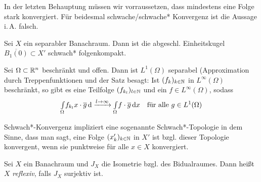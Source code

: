 \documentclass{cheat-sheet}
\newcommand{\IntO}[2]{\Int{\Omega}{}{#1}{#2}} %
\newcommand{\convWith}[1]{\xrightarrow{#1 \to \infty}} %
\newcommand{\convWeaklyWith}[1]{\xrightharpoonup{#1 \to \infty}} %
\begin{document}
\begin{acht}
  In der letzten Behauptung müssen wir vorraussetzen, dass mindestens eine Folge stark konvergiert. Für beidesmal schwache/schwache* Konvergenz ist die Aussage i.\,A. falsch.
\end{acht}

\iffalse
\begin{bsp}
  \begin{itemize}
    \item Sei $1 \leq p < \infty$ und $\tfrac{1}{p} + \tfrac{1}{p'} = 1$ und $\omega \subset \R^n$ beschränkt. Dann gilt für $f, f_k \in L^p(\Omega)$:
    \[ f_k \convWeaklyWith{k} f \text{ in } L^p(\Omega) \iff \fa{g \in L^p(\Omega)} \IntO{f_k \cdot \overline{g}}{x} \convWith{k} \IntO{f \cdot \overline{g}}{x} \]
    \item Sei $\Omega \subset \R^n$ boffen und beschränkt und $1 \leq p \leq \infty$, $m \in \N_{> 0}$. Für $u, u_k \in W^{m,p}(\Omega)$ gilt dann:
    \[ u_k \convWeaklyWith{k} u \text{ in } W^{m,p}(\Omega) \iff \fa{s, \abs{s} \leq m} \partial^s u_k \convWeaklyWith{k} \partial^s u \text{ in } L^p(\Omega) \]
  \end{itemize}
\end{bsp}
\fi

\begin{satz}
  Sei $X$ ein separabler Banachraum. Dann ist die abgeschl. Einheitskugel $\overline{B_1(0)} \subset X'$ schwach* folgenkompakt.
\end{satz}

\begin{bsp}
  Sei $\Omega \subset \R^n$ beschränkt und offen. Dann ist $L^1(\Omega)$ separabel (Approximation durch Treppenfunktionen und der Satz besagt: Ist $(f_k)_{k \in \mathbb{N}}$ in $L^{\infty}(\Omega)$ beschränkt, so gibt es eine Teilfolge $(f_{k_l})_{l \in \mathbb{N}}$ und ein $f \in L^\infty(\Omega)$, sodass
  \[ \IntO{f_{k_l}{x} \cdot \overline{g}} \xrightarrow{l \to \infty} \IntO{f \cdot \overline{g}}{x} \quad \text{für alle $g \in L^1(\Omega)$} \]
\end{bsp}

\begin{bem}
  Schwach*-Konvergenz impliziert eine sogenannte Schwach*-Topologie in dem Sinne, dass man sagt, eine Folge $(x_k')_{k \in \mathbb{N}}$ in $X'$ ist bzgl. dieser Topologie konvergent, wenn sie punktweise für alle $x \in X$ konvergiert.
\end{bem}

\begin{defn}
  Sei $X$ ein Banachraum und $J_X$ die Isometrie bzgl. des Bidualraumes. Dann heißt $X$ \emph{reflexiv}, falls $J_X$ surjektiv ist.
\end{defn}
\end{document}
